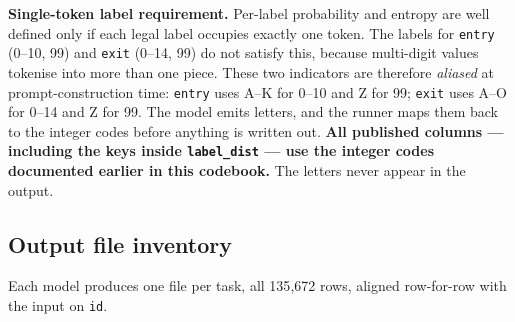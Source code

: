 \documentclass[11pt, a4paper]{article}
\begin{document}
\textbf{Single-token label requirement.} Per-label probability and entropy are well
defined only if each legal label occupies exactly one token. The labels for
\texttt{entry} (0--10, 99) and \texttt{exit} (0--14, 99) do not satisfy this, because
multi-digit values tokenise into more than one piece. These two indicators are
therefore \emph{aliased} at prompt-construction time: \texttt{entry} uses A--K for
0--10 and Z for 99; \texttt{exit} uses A--O for 0--14 and Z for 99. The model emits
letters, and the runner maps them back to the integer codes before anything is
written out. \textbf{All published columns --- including the keys inside
\texttt{label\_\allowbreak dist} --- use the integer codes documented earlier in this
codebook.} The letters never appear in the output.

\subsection{Output file inventory}

Each model produces one file per task, all 135{,}672 rows, aligned row-for-row with
the input on \texttt{id}.
\end{document}
